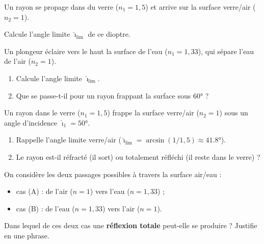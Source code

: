 \documentclass[11pt,a4paper]{article}
\begin{document}
\begin{exo}
Un rayon se propage dans du verre ($n_1=1{,}5$) et arrive sur la surface verre/air ($n_2=1$).

Calcule l'angle limite $\hat{\imath}_{\text{lim}}$ de ce dioptre.
\end{exo}

\begin{exo}
Un plongeur éclaire vers le haut la surface de l'eau ($n_1=1{,}33$), qui sépare l'eau de l'air
($n_2=1$).
\begin{enumerate}[label=\alph*)]
  \item Calcule l'angle limite $\hat{\imath}_{\text{lim}}$.
  \item Que se passe-t-il pour un rayon frappant la surface sous $\ang{60}$ ?
\end{enumerate}
\end{exo}

\begin{exo}
Un rayon dans le verre ($n_1=1{,}5$) frappe la surface verre/air ($n_2=1$) sous un angle d'incidence
$\hat{\imath}_1=\ang{50}$.
\begin{center}
\end{center}
\begin{enumerate}[label=\alph*)]
  \item Rappelle l'angle limite verre/air ($\hat{\imath}_{\text{lim}}=\arcsin(1/1{,}5)\approx\ang{41.8}$).
  \item Le rayon est-il réfracté (il sort) ou totalement réfléchi (il reste dans le verre) ?
\end{enumerate}
\end{exo}

\begin{exo}
On considère les deux passages possibles à travers la surface air/eau :
\begin{itemize}[leftmargin=1.5em,topsep=2pt]
  \item cas (A) : de l'air ($n=1$) vers l'eau ($n=1{,}33$) ;
  \item cas (B) : de l'eau ($n=1{,}33$) vers l'air ($n=1$).
\end{itemize}
Dans lequel de ces deux cas une \textbf{réflexion totale} peut-elle se produire ? Justifie en une
phrase.
\end{exo}
\end{document}
